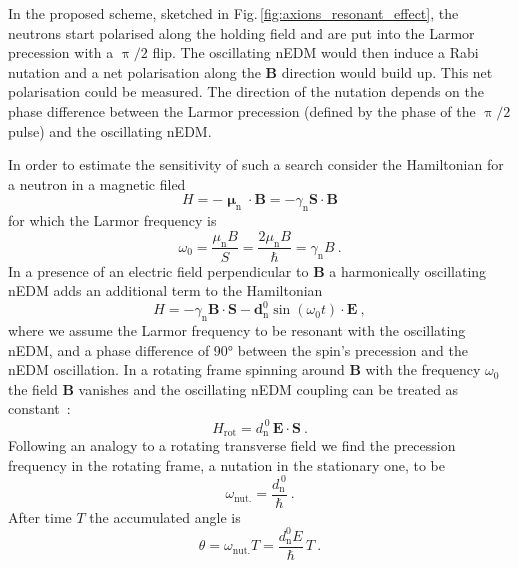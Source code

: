 In the proposed scheme, sketched in Fig.\,\ref{fig:axions_resonant_effect}, the neutrons start polarised along the holding field and are put into the Larmor precession with a $\uppi/2$ flip. The oscillating nEDM would then induce a Rabi nutation and a net polarisation along the $\mathbf{B}$ direction would build up. This net polarisation could be measured. The direction of the nutation depends on the phase difference between the Larmor precession (defined by the phase of the $\uppi/2$ pulse) and the oscillating nEDM\@.

In order to estimate the sensitivity of such a search consider the Hamiltonian for a neutron in a magnetic filed
\begin{equation}
  H = - \boldsymbol{\upmu}_\text{n} \cdot \mathbf{B} = - \gamma_\text{n} \mathbf{S} \cdot \mathbf{B}
\end{equation}
for which the Larmor frequency is
\begin{equation}
  \omega_0 = \frac{\mu_\text{n} B}{S} = \frac{2 \mu_\text{n} B}{\hbar} = \gamma_\text{n} B \ .
\end{equation}
In a presence of an electric field perpendicular to $\mathbf{B}$ a harmonically oscillating nEDM adds an additional term to the Hamiltonian
\begin{equation}
  H = - \gamma_\text{n} \mathbf{B} \cdot \mathbf{S} - \mathbf{d}_\text{n}^0 \sin (\omega_0 t) \cdot \mathbf{E} \ ,
\end{equation}
where we assume the Larmor frequency to be resonant with the oscillating nEDM, and a phase difference of \ang{90} between the spin's precession and the nEDM oscillation. In a rotating frame spinning around $\mathbf{B}$ with the frequency $\omega_0$ the field $\mathbf{B}$ vanishes and the oscillating nEDM coupling can be treated as constant~\cite{RamseyBook}:
\begin{equation}
  H_\text{rot} = d_\text{n}^{\,0} \, \mathbf{E} \cdot \mathbf{S} \ .
\end{equation}
Following an analogy to a rotating transverse field we find the precession frequency in the rotating frame, a nutation in the stationary one, to be
\begin{equation}
  \omega_\text{nut.} = \frac{d_\text{n}^{\,0}}{\hbar} \ .
\end{equation}
After time $T$ the accumulated angle is
\begin{equation}
  \theta = \omega_\text{nut.} T = \frac{d_\text{n}^0 E }{\hbar} \, T \ .
  \label{eq:resonant_the_angle}
\end{equation}
